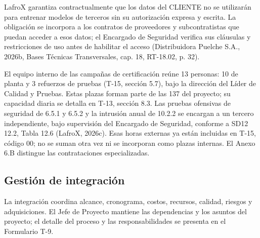 LafroX garantiza contractualmente que los datos del CLIENTE no se utilizarán para entrenar modelos de terceros sin su autorización expresa y escrita. La obligación se incorpora a los contratos de proveedores y subcontratistas que puedan acceder a esos datos; el Encargado de Seguridad verifica sus cláusulas y restricciones de uso antes de habilitar el acceso (Distribuidora Puelche S.A., 2026b, Bases Técnicas Transversales, cap. 18, RT-18.02, p. 32).

El equipo interno de las campañas de certificación reúne 13 personas: 10 de planta y 3 refuerzos de pruebas (T-15, sección 5.7), bajo la dirección del Líder de Calidad y Pruebas. Estas plazas forman parte de las 137 del proyecto; su capacidad diaria se detalla en T-13, sección 8.3. Las pruebas ofensivas de seguridad de 6.5.1 y 6.5.2 y la intrusión anual de 10.2.2 se encargan a un tercero independiente, bajo supervisión del Encargado de Seguridad, conforme a SD12 12.2, Tabla 12.6 (LafroX, 2026c). Esas horas externas ya están incluidas en T-15, código 00; no se suman otra vez ni se incorporan como plazas internas. El Anexo 6.B distingue las contrataciones especializadas.

\subsection{Gestión de integración}

La integración coordina alcance, cronograma, costos, recursos, calidad, riesgos y adquisiciones. El Jefe de Proyecto mantiene las dependencias y los asuntos del proyecto; el detalle del proceso y las responsabilidades se presenta en el Formulario T-9.

